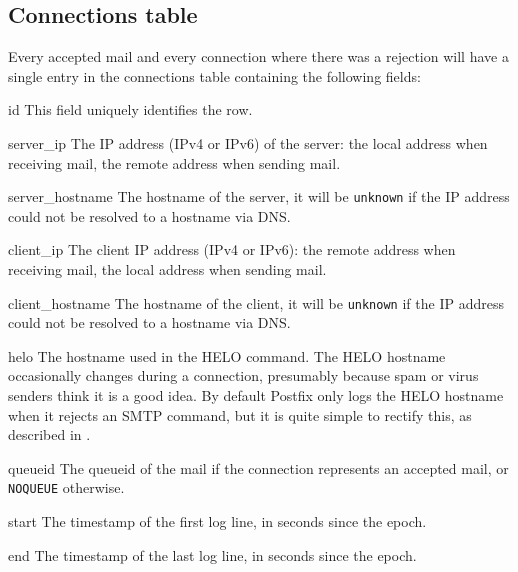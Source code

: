 \subsection{Connections table}

\label{connections table}

Every accepted mail and every connection where there was a rejection will
have a single entry in the connections table containing the following
fields:

\begin{eqlist}

    \item [id] This field uniquely identifies the row.

    \item [server\_ip] The \gls{IP} address (IPv4 or IPv6) of the server:
        the local address when receiving mail, the remote address when
        sending mail.

    \item [server\_hostname] The hostname of the server, it will be
        \texttt{unknown} if the \gls{IP} address could not be resolved to a
        hostname via DNS\@.

    \item [client\_ip] The client \gls{IP} address (IPv4 or IPv6): the
        remote address when receiving mail, the local address when sending
        mail.

    \item [client\_hostname] The hostname of the client, it will be
        \texttt{unknown} if the \gls{IP} address could not be resolved to a
        hostname via DNS\@.

    \item [helo] The hostname used in the HELO command.  The HELO hostname
        occasionally changes during a connection, presumably because spam
        or virus senders think it is a good idea.  By default Postfix only
        logs the HELO hostname when it rejects an \gls{SMTP} command, but
        it is quite simple to rectify this, as described in
        .

    \item [queueid] The queueid of the mail if the connection represents an
        accepted mail, or \texttt{NOQUEUE} otherwise.

    \item [start] The timestamp of the first log line, in seconds since the
        epoch.

    \item [end] The timestamp of the last log line, in seconds since the
        epoch.

\end{eqlist}

